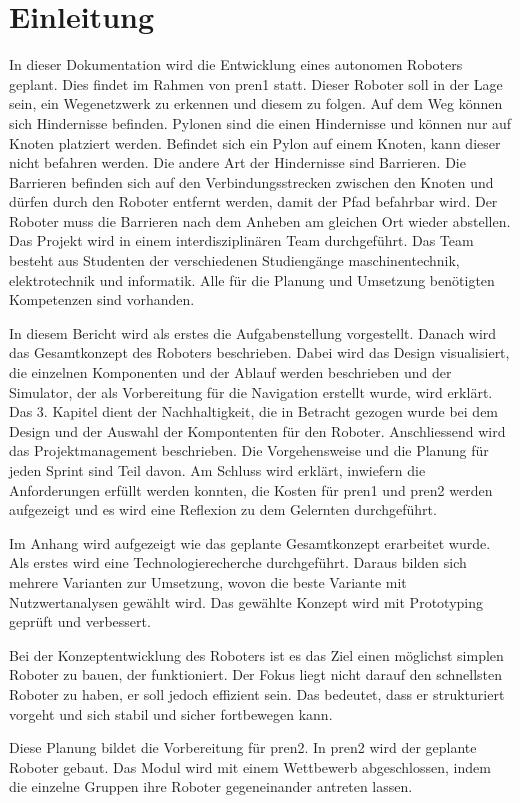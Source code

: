 \section{Einleitung}

In dieser Dokumentation wird die Entwicklung eines autonomen Roboters geplant. Dies findet im Rahmen von \acrfull{pren1} statt. Dieser Roboter soll in der Lage sein, ein Wegenetzwerk zu erkennen und diesem zu folgen. Auf dem Weg können sich Hindernisse befinden. Pylonen sind die einen Hindernisse und können nur auf Knoten platziert werden. Befindet sich ein Pylon auf einem Knoten, kann dieser nicht befahren werden. Die andere Art der Hindernisse sind Barrieren. Die Barrieren befinden sich auf den Verbindungsstrecken zwischen den Knoten und dürfen durch den Roboter entfernt werden, damit der Pfad befahrbar wird. Der Roboter muss die Barrieren nach dem Anheben am gleichen Ort wieder abstellen. 
Das Projekt wird in einem interdisziplinären Team durchgeführt. Das Team besteht aus Studenten der verschiedenen Studiengänge \acrfull{maschinentechnik}, \acrfull{elektrotechnik} und \acrfull{informatik}. Alle für die Planung und Umsetzung benötigten Kompetenzen sind vorhanden.

In diesem Bericht wird als erstes die Aufgabenstellung vorgestellt. Danach wird das Gesamtkonzept des Roboters beschrieben. Dabei wird das Design visualisiert, die einzelnen Komponenten und der Ablauf werden beschrieben und der Simulator, der als Vorbereitung für die Navigation erstellt wurde, wird erklärt. Das 3. Kapitel dient der Nachhaltigkeit, die in Betracht gezogen wurde bei dem Design und der Auswahl der Kompontenten für den Roboter. Anschliessend wird das Projektmanagement beschrieben. Die Vorgehensweise und die Planung für jeden Sprint sind Teil davon.
Am Schluss wird erklärt, inwiefern die Anforderungen erfüllt werden konnten, die Kosten für \acrfull{pren1} und \acrfull{pren2} werden aufgezeigt und es wird eine Reflexion zu dem Gelernten durchgeführt.

Im Anhang wird aufgezeigt wie das geplante Gesamtkonzept erarbeitet wurde. Als erstes wird eine Technologierecherche durchgeführt. Daraus bilden sich mehrere Varianten zur Umsetzung, wovon die beste Variante mit Nutzwertanalysen gewählt wird. Das gewählte Konzept wird mit Prototyping geprüft und verbessert.

Bei der Konzeptentwicklung des Roboters ist es das Ziel einen möglichst simplen Roboter zu bauen, der funktioniert. Der Fokus liegt nicht darauf den schnellsten Roboter zu haben, er soll jedoch effizient sein. Das bedeutet, dass er strukturiert vorgeht und sich stabil und sicher fortbewegen kann.

Diese Planung bildet die Vorbereitung für \acrshort{pren2}. In \acrshort{pren2} wird der geplante Roboter gebaut. Das Modul wird mit einem Wettbewerb abgeschlossen, indem die einzelne Gruppen ihre Roboter gegeneinander antreten lassen.

